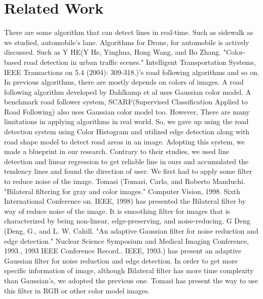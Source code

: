 \section{Related Work}
\label{sec:relatedwork}
There are some algorithm that can detect lines in real-time. Such as sidewalk as we studied, automobile's lane. Algorithms for Drone, for automobile is actively discussed. Such as Y HE(Y He, Yinghua, Hong Wang, and Bo Zhang. "Color-based road detection in urban traffic scenes." Intelligent Transportation Systems, IEEE Transactions on 5.4 (2004): 309-318.)'s road following algorithms and so on. \newline
In previous algorithms, there are mostly depends on colors of images. A road following algorithm developed by Dahlkamp et al uses Gaussian color model. A benchmark road follower system, SCARF(Supervised Classification Applied to Road Following) also uses Gaussian color model too. However, There are many limitations in applying  algorithms in real world. So, we gave up using the road detection system using Color Histogram and utilized edge detection along with road shape model to detect road areas in an image. Adopting this system, we made a blueprint in our research. Contrary to their studies, we used line detection and linear regression to get reliable line in ours and accumulated the tendency lines and found the direction of user. \newline
We first had to apply some filter to reduce noise of the image. Tomasi (Tomasi, Carlo, and Roberto Manduchi. "Bilateral filtering for gray and color images." Computer Vision, 1998. Sixth International Conference on. IEEE, 1998) has presented the Bilateral filter by way of reduce noise of the image. It is smoothing filter for images that is characterized by being non-linear, edge-preserving, and noise-reducing. G Deng (Deng, G., and L. W. Cahill. "An adaptive Gaussian filter for noise reduction and edge detection." Nuclear Science Symposium and Medical Imaging Conference, 1993., 1993 IEEE Conference Record.. IEEE, 1993.) has present an adaptive Gaussian filter for noise reduction and edge detection. In order to get more specific information of image, although Bilateral filter has more time complexity than Gaussian's, we adopted the previous one. Tomasi has present the way to use this filter in RGB or other color model images.\newline
